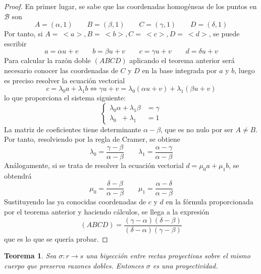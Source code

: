 \documentclass[12pt]{report}
\newtheorem{theorem}{Teorema}[chapter]
\theoremstyle{definition}
\theoremstyle{definition}
\theoremstyle{remark}
\begin{document}
\begin{proof}
En primer lugar, se sabe que las coordenadas homogéneas de los puntos en $\mathcal{B}$ son
\[A = (\alpha, 1) \qquad B = (\beta, 1) \qquad C = (\gamma, 1) \qquad D = (\delta, 1)\]
Por tanto, si $A = \ <a>, B = \ <b>, C = \ <c>, D = \ <d>$, se puede escribir
\[a = \alpha u + v \qquad b = \beta u + v \qquad c = \gamma u + v \qquad d = \delta u + v\]
Para calcular la razón doble $(ABCD)$ aplicando el teorema anterior será necesario conocer las coordenadas de $C$ y $D$ en la base integrada por $a$ y $b$, luego es preciso resolver la ecuación vectorial \[c = \lambda_0 a + \lambda_1 b \iff \gamma u + v = \lambda_0 (\alpha u + v) + \lambda_1 (\beta u + v)\]
lo que proporciona el sistema siguiente:
\[\begin{cases}
    \lambda_0 \alpha + \lambda_1 \beta &= \gamma \\
    \lambda_0 \: \: \, + \lambda_1 &= 1
\end{cases}\]
La matriz de coeficientes tiene determinante $\alpha - \beta$, que es no nulo por ser $A \neq B$. Por tanto, resolviendo por la regla de Cramer, se obtiene
\[\lambda_0 = \frac{\gamma - \beta}{\alpha - \beta} \qquad \lambda_1 = \frac{\alpha - \gamma}{\alpha - \beta}\]
Análogamente, si se trata de resolver la ecuación vectorial $d = \mu_0 a + \mu_1 b$, se obtendrá
\[\mu_0 = \frac{\delta - \beta}{\alpha - \beta} \qquad \mu_1 = \frac{\alpha - \delta}{\alpha - \beta}\]
Sustituyendo las ya conocidas coordenadas de $c$ y $d$ en la fórmula proporcionada por el teorema anterior y haciendo cálculos, se llega a la expresión
\[(ABCD) = \frac{(\gamma - \alpha)(\delta - \beta)}{(\delta - \alpha)(\gamma - \beta)}\]
que es lo que se quería probar.
\end{proof}

\begin{theorem}
\label{teo2.5.}
Sea $\sigma \colon r \to s$ una biyección entre rectas proyectivas sobre el mismo cuerpo que preserva razones dobles. Entonces $\sigma$ es una proyectividad.
\end{theorem}
\end{document}
